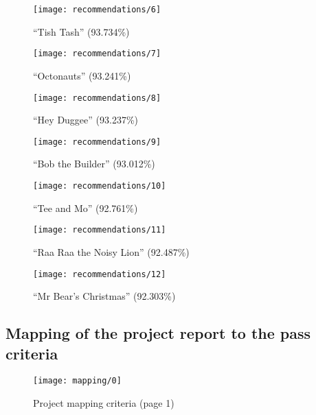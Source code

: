 \begin{figure}[H]
  \centering
  \texttt{[image: recommendations/6]}
  \caption{``Tish Tash'' (93.734\%)}
  \label{fig:recommendations:6}
\end{figure}

\begin{figure}[H]
  \centering
  \texttt{[image: recommendations/7]}
  \caption{``Octonauts'' (93.241\%)}
  \label{fig:recommendations:7}
\end{figure}

\begin{figure}[H]
  \centering
  \texttt{[image: recommendations/8]}
  \caption{``Hey Duggee'' (93.237\%)}
  \label{fig:recommendations:8}
\end{figure}

\begin{figure}[H]
  \centering
  \texttt{[image: recommendations/9]}
  \caption{``Bob the Builder'' (93.012\%)}
  \label{fig:recommendations:9}
\end{figure}

\begin{figure}[H]
  \centering
  \texttt{[image: recommendations/10]}
  \caption{``Tee and Mo'' (92.761\%)}
  \label{fig:recommendations:10}
\end{figure}

\begin{figure}[H]
  \centering
  \texttt{[image: recommendations/11]}
  \caption{``Raa Raa the Noisy Lion'' (92.487\%)}
  \label{fig:recommendations:11}
\end{figure}

\begin{figure}[H]
  \centering
  \texttt{[image: recommendations/12]}
  \caption{``Mr Bear's Christmas'' (92.303\%)}
  \label{fig:recommendations:12}
\end{figure}

\newpage

\subsection{Mapping of the project report to the pass criteria}

\begin{figure}[H]
  \centering
  \texttt{[image: mapping/0]}
  \caption{Project mapping criteria (page 1)}
  \label{fig:mapping:0}
\end{figure}


